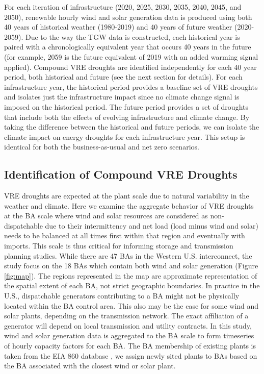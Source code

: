 \documentclass{agujournal2019}
\begin{document}
For each iteration of infrastructure (2020, 2025, 2030, 2035, 2040, 2045, and 2050), renewable hourly wind and solar generation data is produced using both 40 years of historical weather (1980-2019) and 40 years of future weather (2020-2059). Due to the way the TGW data is constructed, each historical year is paired with a chronologically equivalent year that occurs 40 years in the future (for example, 2059 is the future equivalent of 2019 with an added warming signal applied). Compound VRE droughts are identified independently for each 40 year period, both historical and future (see the next section for details). For each infrastructure year, the historical period provides a baseline set of VRE droughts and isolates just the infrastructure impact since no climate change signal is imposed on the historical period. The future period provides a set of droughts that include both the effects of evolving infrastructure and climate change. By taking the difference between the historical and future periods, we can isolate the climate impact on energy droughts for each infrastructure year. This setup is identical for both the business-as-usual and net zero scenarios. 


\subsection{Identification of Compound VRE Droughts}

VRE droughts are expected at the plant scale due to natural variability in the weather and climate. Here we examine the aggregate behavior of VRE droughts at the BA scale where wind and solar resources are considered as non-dispatchable due to their intermittency and net load (load minus wind and solar) needs to be balanced at all times first within that region and eventually with imports. This scale is thus critical for informing storage and transmission planning studies. While there are 47 BAs in the Western U.S. interconnect, the study focus on the 18 BAs which contain both wind and solar generation (Figure \ref{fig:map}). The regions represented in the map are approximate representation of the spatial extent of each BA, not strict geographic boundaries. In practice in the U.S., dispatchable generators contributing to a BA might not be physically located within the BA control area. This also may be the case for some wind and solar plants, depending on the transmission network. The exact affiliation of a generator will depend on local transmission and utility contracts. In this study, wind and solar generation data is aggregated to the BA scale to form timeseries of hourly capacity factors for each BA. The BA membership of existing plants is taken from the EIA 860 database \cite{EIA860}, we assign newly sited plants to BAs based on the BA associated with the closest wind or solar plant. 
\end{document}
